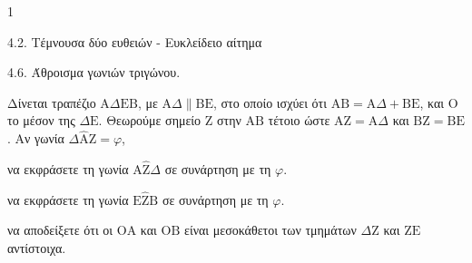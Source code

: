\begin{ylh}{1}
    \item 4.2. Τέμνουσα δύο ευθειών - Ευκλείδειο αίτημα
    \item 4.6. Άθροισμα γωνιών τριγώνου.
\end{ylh}
Δίνεται τραπέζιο $\mathrm{A}\Delta\mathrm{E}\mathrm{B}$, με $\mathrm{A}\Delta \parallel \mathrm{B}\mathrm{E}$, στο οποίο ισχύει ότι $\mathrm{A}\mathrm{B} = \mathrm{A}\Delta + \mathrm{B}\mathrm{E}$, και $\mathrm{O}$ το μέσον της $\Delta\mathrm{E}$. Θεωρούμε σημείο $\mathrm{Z}$ στην $\mathrm{A}\mathrm{B}$ τέτοιο ώστε $\mathrm{A}\mathrm{Z} = \mathrm{A}\Delta$ και $\mathrm{B}\mathrm{Z} = \mathrm{B}\mathrm{E}$.
Αν γωνία $\Delta\hat{\mathrm{A}}\mathrm{Z} = \varphi$,
\begin{alist}
    \item να εκφράσετε τη γωνία $\mathrm{A}\hat{\mathrm{Z}}\Delta$ σε συνάρτηση με τη $\varphi$. 
    \item να εκφράσετε τη γωνία $\mathrm{E}\hat{\mathrm{Z}}\mathrm{B}$ σε συνάρτηση με τη $\varphi$. 
    \item να αποδείξετε ότι οι $\mathrm{O}\mathrm{A}$ και $\mathrm{O}\mathrm{B}$ είναι μεσοκάθετοι των τμημάτων $\Delta\mathrm{Z}$ και $\mathrm{Z}\mathrm{E}$ αντίστοιχα. 
\end{alist}
